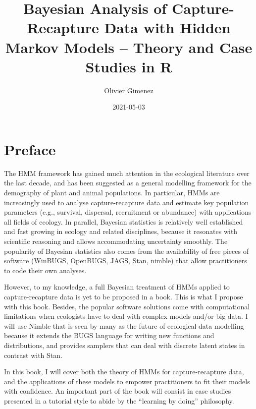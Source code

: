 \documentclass[
  12pt,
]{krantz}
\title{Bayesian Analysis of Capture-Recapture Data with Hidden Markov Models -- Theory and Case Studies in R}
\author{Olivier Gimenez}
\date{2021-05-03}
\begin{document}
\maketitle

\thispagestyle{empty}

\setlength{\abovedisplayskip}{-5pt}
\setlength{\abovedisplayshortskip}{-5pt}

{
\hypersetup{linkcolor=}
\setcounter{tocdepth}{2}
\tableofcontents
}
\listoftables
\listoffigures
\hypertarget{preface}{%
\chapter*{Preface}\label{preface}}


The HMM framework has gained much attention in the ecological literature over the last decade, and has been suggested as a general modelling framework for the demography of plant and animal populations. In particular, HMMs are increasingly used to analyse capture-recapture data and estimate key population parameters (e.g., survival, dispersal, recruitment or abundance) with applications all fields of ecology. In parallel, Bayesian statistics is relatively well established and fast growing in ecology and related disciplines, because it resonates with scientific reasoning and allows accommodating uncertainty smoothly. The popularity of Bayesian statistics also comes from the availability of free pieces of software (WinBUGS, OpenBUGS, JAGS, Stan, nimble) that allow practitioners to code their own analyses.

However, to my knowledge, a full Bayesian treatment of HMMs applied to capture-recapture data is yet to be proposed in a book. This is what I propose with this book. Besides, the popular software solutions come with computational limitations when ecologists have to deal with complex models and/or big data. I will use Nimble that is seen by many as the future of ecological data modelling because it extends the BUGS language for writing new functions and distributions, and provides samplers that can deal with discrete latent states in contrast with Stan.

In this book, I will cover both the theory of HMMs for capture-recapture data, and the applications of these models to empower practitioners to fit their models with confidence. An important part of the book will consist in case studies presented in a tutorial style to abide by the ``learning by doing'' philosophy.
\end{document}
